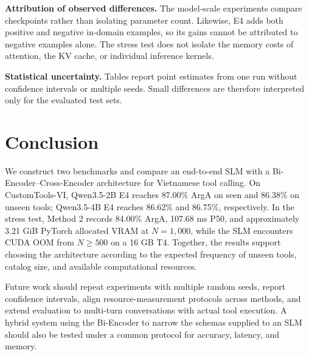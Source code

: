 \documentclass[10pt,twocolumn,a4paper]{article}
\begin{document}
\textbf{Attribution of observed differences.} The model-scale experiments compare checkpoints rather than isolating parameter count. Likewise, E4 adds both positive and negative in-domain examples, so its gains cannot be attributed to negative examples alone. The stress test does not isolate the memory costs of attention, the KV cache, or individual inference kernels.

\textbf{Statistical uncertainty.} Tables report point estimates from one run without confidence intervals or multiple seeds. Small differences are therefore interpreted only for the evaluated test sets.

\section{Conclusion}
We construct two benchmarks and compare an end-to-end SLM with a Bi-Encoder--Cross-Encoder architecture for Vietnamese tool calling. On CustomTools-VI, Qwen3.5-2B E4 reaches 87.00\% ArgA on seen and 86.38\% on unseen tools; Qwen3.5-4B E4 reaches 86.62\% and 86.75\%, respectively. In the stress test, Method 2 records 84.00\% ArgA, 107.68 ms P50, and approximately 3.21 GiB PyTorch allocated VRAM at $N=1{,}000$, while the SLM encounters CUDA OOM from $N\geq500$ on a 16 GB T4. Together, the results support choosing the architecture according to the expected frequency of unseen tools, catalog size, and available computational resources.

Future work should repeat experiments with multiple random seeds, report confidence intervals, align resource-measurement protocols across methods, and extend evaluation to multi-turn conversations with actual tool execution. A hybrid system using the Bi-Encoder to narrow the schemas supplied to an SLM should also be tested under a common protocol for accuracy, latency, and memory.



\end{document}
